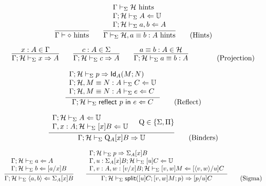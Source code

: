 \documentclass{amsart}
\begin{document}
\begin{equation}
  \infer{\Gamma\vdash \emp\hints}{}
  \qquad
  \infer{
    \Gamma\vdash_\Sigma \mathcal{H}, a\equiv b:A\hints
  }{
    \begin{array}{l}
      \Gamma\vdash_\Sigma \mathcal{H}\hints\\
      \Gamma;\mathcal{H}\vdash_\Sigma A\checks\uni\\
      \Gamma;\mathcal{H}\vdash_\Sigma a,b\checks A
    \end{array}
  }
  \tag{Hints}
\end{equation}

\begin{equation}
  \infer{
    \Gamma;\mathcal{H}\vdash_\Sigma x\infers A
  }{
    x:A\in\Gamma
  }
  \qquad
  \infer{
    \Gamma;\mathcal{H}\vdash_\Sigma c\infers A
  }{
    c:A\in\Sigma
  }
  \qquad
  \infer{
    \Gamma;\mathcal{H}\vdash_\Sigma a\equiv b:A
  }{
    a\equiv b:A \in \mathcal{H}
  }
  \qquad
  \tag{Projection}
\end{equation}

\begin{equation}
  \infer{
    \Gamma;\mathcal{H}\vdash_\Sigma \mathsf{reflect}\ p\ \mathsf{in}\ e \checks C
  }{
    \begin{array}{l}
      \Gamma;\mathcal{H}\vdash_\Sigma p \infers \mathsf{Id}_A(M;N)\\
      \Gamma;\mathcal{H}, M\equiv N:A\vdash_\Sigma C\checks\uni\\
      \Gamma;\mathcal{H}, M\equiv N:A\vdash_\Sigma e \checks C
    \end{array}
  }
  \tag{Reflect}
\end{equation}

\begin{equation}
  \infer{
    \Gamma;\mathcal{H}\vdash_\Sigma\mathrm{Q}_A[x]B\infers\uni
  }{
    \begin{array}{l}
      \Gamma;\mathcal{H}\vdash_\Sigma A \checks\uni\\
      \Gamma,x:A;\mathcal{H}\vdash_\Sigma [x]B\checks\uni
    \end{array} &
    \mathrm{Q} \in \{ \Sigma, \Pi \}
  }
  \tag{Binders}
\end{equation}

\begin{equation}
  \infer{
    \Gamma;\mathcal{H}\vdash_\Sigma \langle a,b\rangle \checks \Sigma_A[x]B
  }{
    \begin{array}{l}
      \Gamma;\mathcal{H}\vdash_\Sigma a\checks A\\
      \Gamma;\mathcal{H}\vdash_\Sigma b\checks [a/x]B
    \end{array}
  }
  \qquad
  \infer{
    \Gamma;\mathcal{H}\vdash_\Sigma \mathsf{split}([u]C; [v,w]M; p)\infers [p/u]C
  }{
    \begin{array}{l}
      \Gamma;\mathcal{H}\vdash_\Sigma p\infers \Sigma_A[x]B\\
      \Gamma,u:\Sigma_A[x]B;\mathcal{H}\vdash_\Sigma [u]C\checks\uni\\
      \Gamma,v:A,w:[v/x]B;\mathcal{H}\vdash_\Sigma [v,w]M\checks[\langle v,w\rangle/u]C
    \end{array}
  }
  \tag{Sigma}
\end{equation}
\end{document}
